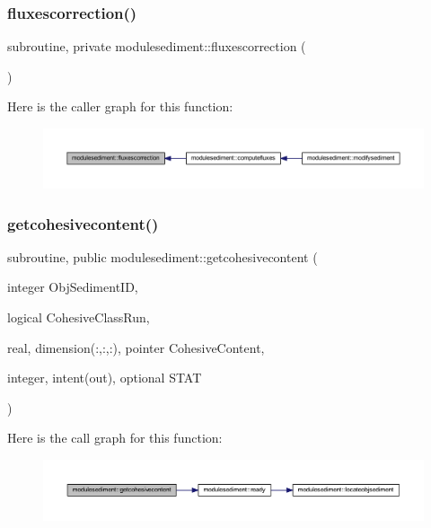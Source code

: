\subsubsection{\texorpdfstring{fluxescorrection()}{fluxescorrection()}}
{\footnotesize\ttfamily subroutine, private modulesediment\+::fluxescorrection (\begin{DoxyParamCaption}{ }\end{DoxyParamCaption})\hspace{0.3cm}{\ttfamily [private]}}

Here is the caller graph for this function\+:\nopagebreak
\begin{figure}[H]
\begin{center}
\leavevmode
\includegraphics[width=350pt]{namespacemodulesediment_a982ebf7fcffb2f4bd698f8ec31fea0d1_icgraph}
\end{center}
\end{figure}
\mbox{\label{namespacemodulesediment_a595e3a876982089ba4949f113b1a0580}} 
\subsubsection{\texorpdfstring{getcohesivecontent()}{getcohesivecontent()}}
{\footnotesize\ttfamily subroutine, public modulesediment\+::getcohesivecontent (\begin{DoxyParamCaption}\item[{integer}]{Obj\+Sediment\+ID,  }\item[{logical}]{Cohesive\+Class\+Run,  }\item[{real, dimension(\+:,\+:,\+:), pointer}]{Cohesive\+Content,  }\item[{integer, intent(out), optional}]{S\+T\+AT }\end{DoxyParamCaption})}

Here is the call graph for this function\+:\nopagebreak
\begin{figure}[H]
\begin{center}
\leavevmode
\includegraphics[width=350pt]{namespacemodulesediment_a595e3a876982089ba4949f113b1a0580_cgraph}
\end{center}
\end{figure}
\mbox{\label{namespacemodulesediment_ae44dda471948f0f9a9a2e1c32fd50738}} 
